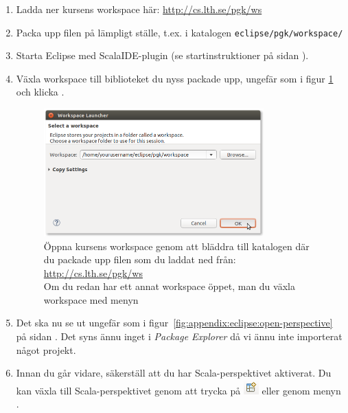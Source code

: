 \begin{enumerate}
\item Ladda ner kursens workspace här: \url{http://cs.lth.se/pgk/ws}

\item Packa upp filen på lämpligt ställe, t.ex. i katalogen \texttt{eclipse/pgk/workspace/}

\item Starta Eclipse med ScalaIDE-plugin (se startinstruktioner på sidan \pageref{subsubsection:start:eclipse}).

\item Växla workspace till biblioteket du nyss packade upp, ungefär som i figur \ref{fig:eclipse:ide:open} och klicka .

\begin{figure}[H]
\centering
\includegraphics[width=0.8\textwidth]{../img/eclipse/eclipse-select-workspace.png}
\caption {Öppna kursens workspace genom att bläddra till katalogen där du packade upp filen som du laddat ned från: \url{http://cs.lth.se/pgk/ws} \\Om du redan har ett annat workspace öppet, man du växla workspace med menyn }
\label{fig:eclipse:ide:open}
\end{figure}

\item
Det ska nu se ut ungefär som i figur~\ref{fig:appendix:eclipse:open-perspective} på sidan \pageref{fig:appendix:eclipse:open-perspective}. Det syns ännu inget i \textit{Package Explorer} då vi ännu inte importerat något projekt.

\item Innan du går vidare, säkerställ att du har Scala-perspektivet aktiverat. Du kan växla till Scala-perspektivet genom att trycka på \includegraphics[scale=0.75]{../img/eclipse/eclipse-perspective-button.png} eller genom menyn .



\end{enumerate}
